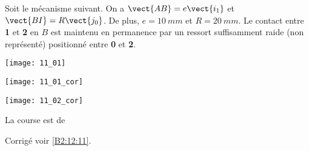 \normalfalse \difficiletrue \tdifficilefalse
\correctiontrue


\setcounter{question}{0}
\ifcorrection
\else
{}
\fi

\ifprof
\else
Soit le mécanisme suivant. On a $\vect{AB}=e\vect{i_1}$ et $\vect{BI}=R\vect{j_0}$. De plus, 
$e=\SI{10}{mm}$ et $R=\SI{20}{mm}$. Le contact entre \textbf{1} et \textbf{2} en $B$ est maintenu en permanence par un ressort suffisamment raide (non représenté) positionné entre \textbf{0} et \textbf{2}. 
\begin{center}
\texttt{[image: 11\_01]}
\end{center}
\fi

\ifprof
\begin{center}
\texttt{[image: 11\_01\_cor]}
\end{center}
\else
\fi

\ifprof
\else
\fi

\ifprof
\else
\fi

\ifprof
\begin{center}
\texttt{[image: 11\_02\_cor]}
\end{center}
\else
\fi


\ifprof
La course est de 
\else
\fi



\ifprof
\else
\begin{flushright}
\footnotesize{Corrigé  voir \ref{B2:12:11}.}
\end{flushright}%
\fi